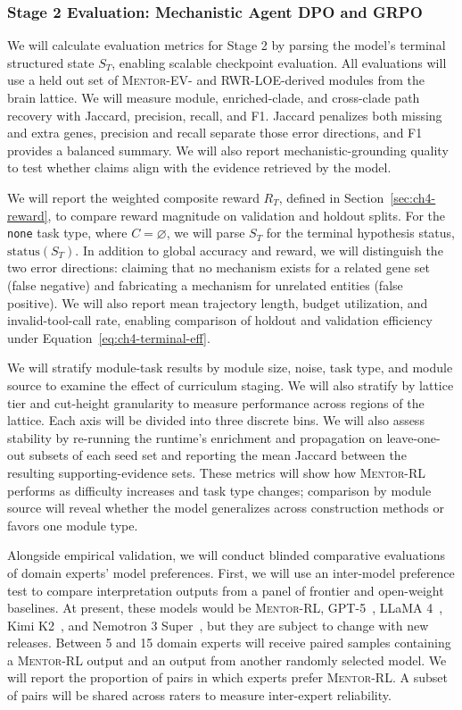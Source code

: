 \documentclass[thesis,letterpaper,12pt]{utthesis}
\begin{document}
\subsubsection{Stage 2 Evaluation: Mechanistic Agent DPO and GRPO}\label{sec:ch4-stage2-eval}
We will calculate evaluation metrics for Stage 2 by parsing the model's terminal structured state $S_T$, enabling scalable checkpoint evaluation. All evaluations will use a held out set of \textsc{Mentor-EV}- and RWR-LOE-derived modules from the brain lattice. We will measure module, enriched-clade, and cross-clade path recovery with Jaccard, precision, recall, and F1. Jaccard penalizes both missing and extra genes, precision and recall separate those error directions, and F1 provides a balanced summary. We will also report mechanistic-grounding quality to test whether claims align with the evidence retrieved by the model.

We will report the weighted composite reward $R_T$, defined in Section~\ref{sec:ch4-reward}, to compare reward magnitude on validation and holdout splits. For the \texttt{none} task type, where $C = \varnothing$, we will parse $S_T$ for the terminal hypothesis status, $\mathrm{status}(S_T)$. In addition to global accuracy and reward, we will distinguish the two error directions: claiming that no mechanism exists for a related gene set (false negative) and fabricating a mechanism for unrelated entities (false positive). We will also report mean trajectory length, budget utilization, and invalid-tool-call rate, enabling comparison of holdout and validation efficiency under Equation~\ref{eq:ch4-terminal-eff}.

We will stratify module-task results by module size, noise, task type, and module source to examine the effect of curriculum staging. We will also stratify by lattice tier and cut-height granularity to measure performance across regions of the lattice. Each axis will be divided into three discrete bins. We will also assess stability by re-running the runtime's enrichment and propagation on leave-one-out subsets of each seed set and reporting the mean Jaccard between the resulting supporting-evidence sets. These metrics will show how \textsc{Mentor-RL} performs as difficulty increases and task type changes; comparison by module source will reveal whether the model generalizes across construction methods or favors one module type.

Alongside empirical validation, we will conduct blinded comparative evaluations of domain experts' model preferences. First, we will use an inter-model preference test to compare interpretation outputs from a panel of frontier and open-weight baselines. At present, these models would be \textsc{Mentor-RL}, GPT-5~\cite{gpt5}, LLaMA 4~\cite{llama4}, Kimi K2~\cite{kimik2}, and Nemotron 3 Super~\cite{nemotron3}, but they are subject to change with new releases. Between 5 and 15 domain experts will receive paired samples containing a \textsc{Mentor-RL} output and an output from another randomly selected model. We will report the proportion of pairs in which experts prefer \textsc{Mentor-RL}. A subset of pairs will be shared across raters to measure inter-expert reliability.
\end{document}
